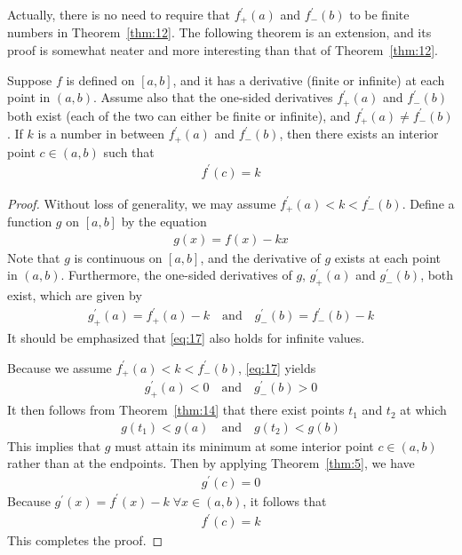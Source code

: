 \documentclass[thmcnt=section, 12pt]{my-elegantbook}
\begin{document}
\par Actually, there is no need to require that $f^\prime_{+}(a)$ and $f^\prime_{-}(b)$ to be finite numbers in Theorem~\ref{thm:12}. The following theorem is an extension, and its proof is somewhat neater and more interesting than that of Theorem~\ref{thm:12}.

\begin{theorem} \label{thm:13}
    Suppose $f$ is defined on $[a, b]$, and it has a derivative (finite or infinite) at each point in $(a, b)$. Assume also that the one-sided derivatives $f^\prime_{+}(a)$ and $f^\prime_{-}(b)$ both exist (each of the two can either be finite or infinite), and $f^\prime_{+}(a) \neq f^\prime_{-}(b)$. If $k$ is a number in between $f^\prime_{+}(a)$ and $f^\prime_{-}(b)$, then there exists an interior point $c \in (a, b)$ such that
    \begin{align*}
        f^\prime(c) = k
    \end{align*}
\end{theorem}

\begin{proof}
    Without loss of generality, we may assume $f^\prime_{+}(a) < k <  f^\prime_{-}(b)$. Define a function $g$ on $[a, b]$ by the equation
    \begin{align*}
        g(x) = f(x) - kx
    \end{align*}
    Note that $g$ is continuous on $[a, b]$, and the derivative of $g$ exists at each point in $(a, b)$. Furthermore, the one-sided derivatives of $g$, $g^\prime_{+}(a)$ and $g^\prime_{-}(b)$, both exist, which are given by
    \begin{align}
        g^\prime_{+}(a) = f^\prime_{+}(a) - k
        \quad \text{and} \quad
        g^\prime_{-}(b) = f^\prime_{-}(b) - k
        \label{eq:17}
    \end{align}
    It should be emphasized that \eqref{eq:17} also holds for infinite values.

    \par Because we assume $f^\prime_{+}(a) < k <  f^\prime_{-}(b)$, \eqref{eq:17} yields
    \begin{align*}
        g^\prime_{+}(a) < 0
        \quad \text{and} \quad
        g^\prime_{-}(b) > 0
    \end{align*}
    It then follows from Theorem~\ref{thm:14} that there exist points $t_1$ and $t_2$ at which
    \begin{align*}
        g(t_1) < g(a)
        \quad \text{and} \quad
        g(t_2) < g(b)
    \end{align*}
    This implies that $g$ must attain its minimum at some interior point $c \in (a, b)$ rather than at the endpoints. Then by applying Theorem~\ref{thm:5}, we have
    \begin{align*}
        g^\prime(c) = 0
    \end{align*}
    Because $g^\prime(x) = f^\prime(x) - k \; \forall x \in (a, b)$, it follows that
    \begin{align*}
        f^\prime(c) = k
    \end{align*}
    This completes the proof.
\end{proof}
\end{document}
